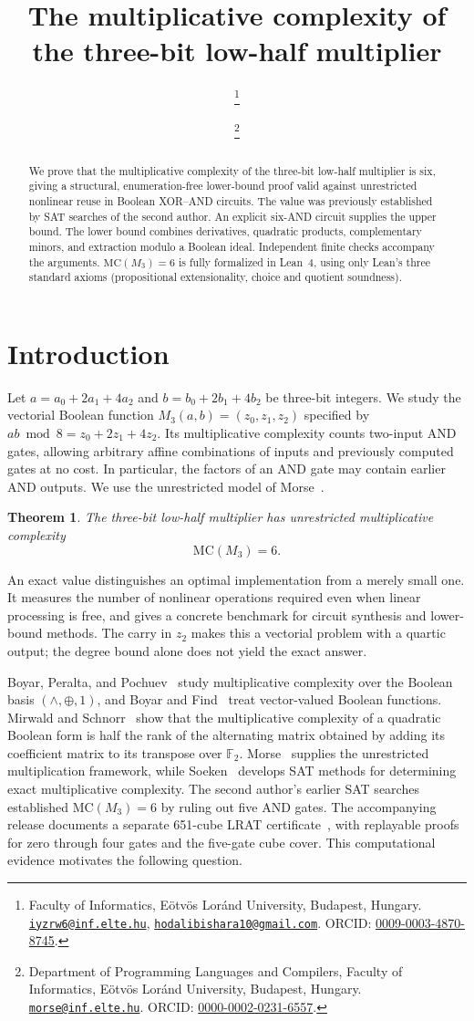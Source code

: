 \documentclass[11pt,a4paper]{article}
\title{The multiplicative complexity of the three-bit low-half multiplier}
\author{\FirstAuthorName\thanks{\raggedright Faculty of Informatics, E\"otv\"os Lor\'and University, Budapest, Hungary.
    \href{mailto:iyzrw6@inf.elte.hu}{\texttt{iyzrw6@inf.elte.hu}},
    \href{mailto:hodalibishara10@gmail.com}{\texttt{hodalibishara10@gmail.com}}.
    ORCID: \href{https://orcid.org/0009-0003-4870-8745}{0009-0003-4870-8745}.}
  \and \SecondAuthorName\thanks{Department of Programming Languages and Compilers,
    Faculty of Informatics, E\"otv\"os Lor\'and University, Budapest, Hungary.
    \href{mailto:morse@inf.elte.hu}{\texttt{morse@inf.elte.hu}}.
    ORCID: \href{https://orcid.org/0000-0002-0231-6557}{0000-0002-0231-6557}.}}
\date{}
\theoremstyle{plain}
\newtheorem{theorem}{Theorem}
\theoremstyle{remark}
\theoremstyle{plain}
\newcommand{\F}{\mathbb F_2}
\begin{document}
\maketitle
\begin{abstract}
We prove that the multiplicative complexity of the three-bit low-half multiplier is six, giving a structural, enumeration-free lower-bound proof valid against unrestricted nonlinear reuse in Boolean XOR--AND circuits. The value was previously established by SAT searches of the second author. An explicit six-AND circuit supplies the upper bound. The lower bound combines derivatives, quadratic products, complementary minors, and extraction modulo a Boolean ideal. Independent finite checks accompany the arguments. $\mathrm{MC}(M_3)=6$ is fully formalized in Lean~4, using only Lean's three standard axioms (propositional extensionality, choice and quotient soundness).
\end{abstract}
\setcounter{tocdepth}{1}
\tableofcontents
\clearpage

\section{Introduction}\label{sec:introduction}
Let $a=a_0+2a_1+4a_2$ and $b=b_0+2b_1+4b_2$ be three-bit integers. We study the vectorial Boolean function $M_3(a,b)=(z_0,z_1,z_2)$ specified by $ab\bmod8=z_0+2z_1+4z_2$. Its multiplicative complexity counts two-input AND gates, allowing arbitrary affine combinations of inputs and previously computed gates at no cost. In particular, the factors of an AND gate may contain earlier AND outputs. We use the unrestricted model of Morse~\cite{morse}.

\begin{theorem}\label{thm:MC}
The three-bit low-half multiplier has unrestricted multiplicative complexity
\[
\mathrm{MC}(M_3)=6.
\]
\end{theorem}

An exact value distinguishes an optimal implementation from a merely small one. It measures the number of nonlinear operations required even when linear processing is free, and gives a concrete benchmark for circuit synthesis and lower-bound methods. The carry in $z_2$ makes this a vectorial problem with a quartic output; the degree bound alone does not yield the exact answer.

Boyar, Peralta, and Pochuev~\cite{bpp} study multiplicative complexity over the Boolean basis $(\wedge,\oplus,1)$, and Boyar and Find~\cite{bf} treat vector-valued Boolean functions. Mirwald and Schnorr~\cite{mirwald-schnorr} show that the multiplicative complexity of a quadratic Boolean form is half the rank of the alternating matrix obtained by adding its coefficient matrix to its transpose over $\F$. Morse~\cite{morse} supplies the unrestricted multiplication framework, while Soeken~\cite{soeken} develops SAT methods for determining exact multiplicative complexity. The second author's earlier SAT searches established $\mathrm{MC}(M_3)=6$ by ruling out five AND gates. The accompanying release documents a separate 651-cube LRAT certificate~\cite{cert}, with replayable proofs for zero through four gates and the five-gate cube cover. This computational evidence motivates the following question.
\end{document}
